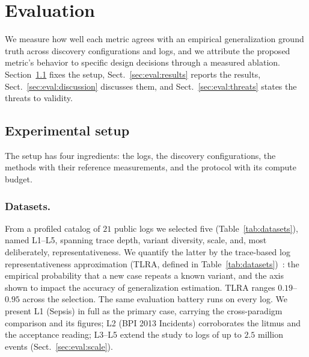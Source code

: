 \documentclass[runningheads]{llncs}
\begin{document}
\section{Evaluation}
\label{sec:eval}
We measure how well each metric agrees with an empirical generalization ground truth across discovery configurations and logs, and we attribute the proposed metric's behavior to specific design decisions through a measured ablation. Section~\ref{sec:eval:setup} fixes the setup, Sect.~\ref{sec:eval:results} reports the results, Sect.~\ref{sec:eval:discussion} discusses them, and Sect.~\ref{sec:eval:threats} states the threats to validity.

\subsection{Experimental setup}
\label{sec:eval:setup}
The setup has four ingredients: the logs, the discovery configurations, the methods with their reference measurements, and the protocol with its compute budget.

\subsubsection{Datasets.}
From a profiled catalog of $21$ public logs we selected five (Table~\ref{tab:datasets}), named L1--L5, spanning trace depth, variant diversity, scale, and, most deliberately, representativeness. We quantify the latter by the trace-based log representativeness approximation (TLRA, defined in Table~\ref{tab:datasets})~\cite{karunaratne2024representativeness}: the empirical probability that a new case repeats a known variant, and the axis shown to impact the accuracy of generalization estimation. TLRA ranges $0.19$--$0.95$ across the selection. The same evaluation battery runs on every log. We present L1 (Sepsis) in full as the primary case, carrying the cross-paradigm comparison and its figures; L2 (BPI 2013 Incidents) corroborates the litmus and the acceptance reading; L3--L5 extend the study to logs of up to $2.5$ million events (Sect.~\ref{sec:eval:scale}).
\end{document}
